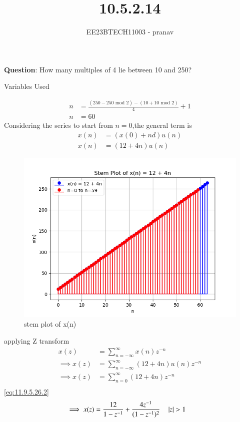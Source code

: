 \documentclass[journal,12pt,twocolumn]{IEEEtran}
\theoremstyle{remark}
\begin{document}

\vspace{3cm}

\title{10.5.2.14}
\author{EE23BTECH11003 - pranav}
\maketitle
\newpage

\bigskip
\renewcommand{\thefigure}{\arabic{figure}}
\renewcommand{\thetable}{\arabic{table}}

\textbf{Question}:
How many multiples of 4 lie between 10 and 250?\\
\solution
\begin{table}[h]
    \centering
    
    \caption{Variables Used}
    \label{tab:10.5.2.14}
\end{table}
\begin{align}
    n&=\frac{(250-250 \text{ mod } 2)-(10+10\text{ mod } 2)}{4}+1\\
    n&=60
\end{align}
Considering the series to start from $n=0$,the general term is
\begin{align}
x(n)&=(x(0)+nd)u(n)\\
x(n)&=(12+4n)u(n)
\end{align}
\begin{figure}[h!]
    \centering
    \includegraphics[width=1.1\linewidth]{figs/graph1.png}
    \caption{stem plot of x(n)}
\end{figure}
applying Z transform
\begin{align}
    x(z)&= \sum_{n=-\infty}^{\infty}x(n) z^{-n}\\
   \implies x(z)&= \sum_{n=-\infty}^{\infty} (12+4n) u(n) z^{-n}\\
   \implies x(z) &=\sum_{n= 0}^{\infty} (12+4n)  z^{-n}\\
   \end{align}
    \ref{eq:11.9.5.26.2}\\
   \begin{align}
   \implies x(z)&=\frac{12}{1-z^{-1}}+\frac{4 z^{-1}}{(1-z^{-1})^{2}}\quad \left\vert z\right\vert>1
\end{align}
\end{document}

